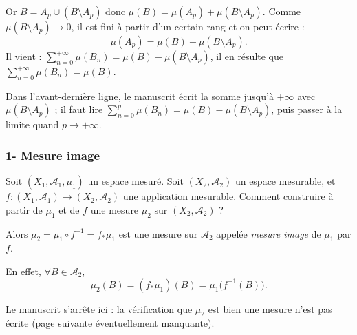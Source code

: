 \documentclass[11pt,a4paper]{article}
\newcommand{\Rb}{\overline{\mathbb{R}}}
\newcommand{\A}{\mathscr{A}}
\begin{document}
Or $B=A_p\cup(B\setminus A_p)$ donc $\mu(B)=\mu(A_p)+\mu(B\setminus A_p)$.
Comme $\mu(B\setminus A_p)\to0$, il est fini à partir d'un certain rang et on peut écrire :
\[
  \mu(A_p)=\mu(B)-\mu(B\setminus A_p).
\]
Il vient : $\displaystyle\sum_{n=0}^{+\infty}\mu(B_n)=\mu(B)-\mu(B\setminus A_p)$, il en résulte que
$\displaystyle\sum_{n=0}^{+\infty}\mu(B_n)=\mu(B)$.

\begin{note}
Dans l'avant-dernière ligne, le manuscrit écrit la somme jusqu'à $+\infty$ avec $\mu(B\setminus A_p)$ ; il faut lire
$\sum_{n=0}^{p}\mu(B_n)=\mu(B)-\mu(B\setminus A_p)$, puis passer à la limite quand $p\to+\infty$.
\end{note}

\subsubsection*{1- Mesure image}

Soit $(X_1,\A_1,\mu_1)$ un espace mesuré. Soit $(X_2,\A_2)$ un espace mesurable, et $f:(X_1,\A_1)\to(X_2,\A_2)$ une application mesurable.
Comment construire à partir de $\mu_1$ et de $f$ une mesure $\mu_2$ sur $(X_2,\A_2)$ ?

\begin{center}
\end{center}

Alors $\mu_2=\mu_1\circ f^{-1}=f_*\mu_1$ est une mesure sur $\A_2$ appelée \emph{mesure image} de $\mu_1$ par $f$.

En effet, $\forall B\in\A_2$,
\[
  \mu_2(B)=(f_*\mu_1)(B)=\mu_1\bigl(f^{-1}(B)\bigr).
\]

\begin{note}
Le manuscrit s'arrête ici : la vérification que $\mu_2$ est bien une mesure n'est pas écrite (page suivante éventuellement manquante).
\end{note}
\end{document}
